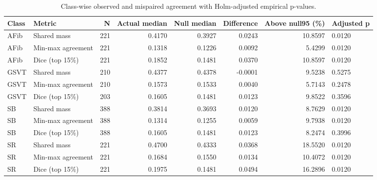 \begin{table}[t]
\caption{Class-wise observed and mispaired agreement with Holm-adjusted empirical p-values.}
\label{tab:04_classwise_chance_calibration}
\begin{tabular}{llrrrrrl}
\toprule
Class & Metric & N & Actual median & Null median & Difference & Above null95 (\%) & Adjusted p \\
\midrule
AFib & Shared mass & 221 & 0.4170 & 0.3927 & 0.0243 & 10.8597 & 0.0120 \\
AFib & Min-max agreement & 221 & 0.1318 & 0.1226 & 0.0092 & 5.4299 & 0.0120 \\
AFib & Dice (top 15\%) & 221 & 0.1852 & 0.1481 & 0.0370 & 10.8597 & 0.0120 \\
GSVT & Shared mass & 210 & 0.4377 & 0.4378 & -0.0001 & 9.5238 & 0.5275 \\
GSVT & Min-max agreement & 210 & 0.1573 & 0.1533 & 0.0040 & 5.7143 & 0.2478 \\
GSVT & Dice (top 15\%) & 203 & 0.1605 & 0.1481 & 0.0123 & 9.8522 & 0.3596 \\
SB & Shared mass & 388 & 0.3814 & 0.3693 & 0.0120 & 8.7629 & 0.0120 \\
SB & Min-max agreement & 388 & 0.1314 & 0.1255 & 0.0059 & 9.7938 & 0.0120 \\
SB & Dice (top 15\%) & 388 & 0.1605 & 0.1481 & 0.0123 & 8.2474 & 0.3996 \\
SR & Shared mass & 221 & 0.4700 & 0.4333 & 0.0368 & 18.5520 & 0.0120 \\
SR & Min-max agreement & 221 & 0.1684 & 0.1550 & 0.0134 & 10.4072 & 0.0120 \\
SR & Dice (top 15\%) & 221 & 0.1975 & 0.1481 & 0.0494 & 16.2896 & 0.0120 \\
\bottomrule
\end{tabular}
\end{table}
